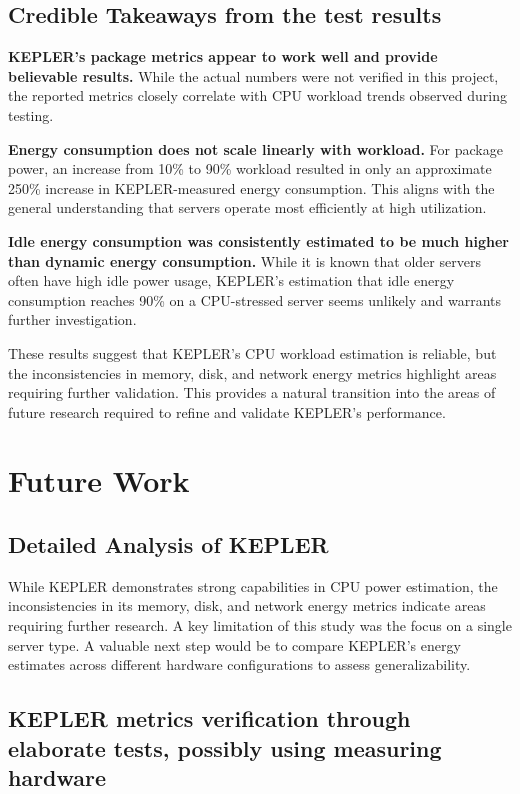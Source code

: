 \subsection{Credible Takeaways from the test results}

\textbf{KEPLER’s package metrics appear to work well and provide believable results.} While the actual numbers were not verified in this project, the reported metrics closely correlate with CPU workload trends observed during testing.

\textbf{Energy consumption does not scale linearly with workload.} For package power, an increase from 10\% to 90\% workload resulted in only an approximate 250\% increase in KEPLER-measured energy consumption. This aligns with the general understanding that servers operate most efficiently at high utilization.

\textbf{Idle energy consumption was consistently estimated to be much higher than dynamic energy consumption.} While it is known that older servers often have high idle power usage, KEPLER’s estimation that idle energy consumption reaches 90\% on a CPU-stressed server seems unlikely and warrants further investigation.

These results suggest that KEPLER’s CPU workload estimation is reliable, but the inconsistencies in memory, disk, and network energy metrics highlight areas requiring further validation. This provides a natural transition into the areas of future research required to refine and validate KEPLER’s performance.

\section{Future Work}

\subsection{Detailed Analysis of KEPLER}

While KEPLER demonstrates strong capabilities in CPU power estimation, the inconsistencies in its memory, disk, and network energy metrics indicate areas requiring further research. A key limitation of this study was the focus on a single server type. A valuable next step would be to compare KEPLER’s energy estimates across different hardware configurations to assess generalizability.

\subsection{KEPLER metrics verification through elaborate tests, possibly using measuring hardware}


